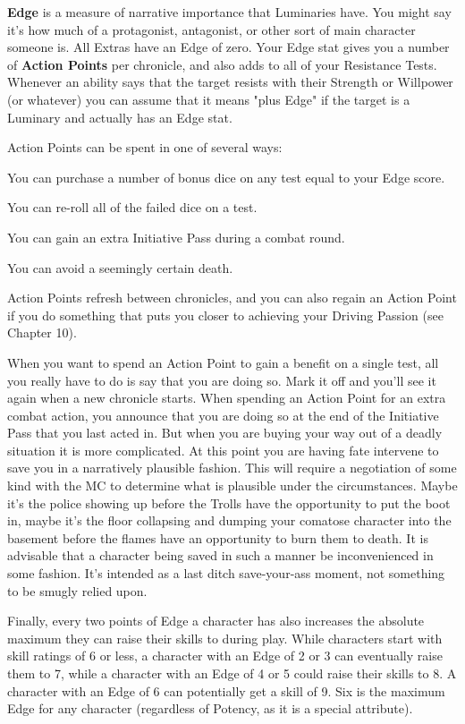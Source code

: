 \hspace{\parindent} \textbf{Edge} is a measure of narrative importance that Luminaries have. You might say it's how much of a protagonist, antagonist, or other sort of main character someone is. All Extras have an Edge of zero. Your Edge stat gives you a number of \textbf{Action Points} per chronicle, and also adds to all of your Resistance Tests. Whenever an ability says that the target resists with their Strength or Willpower (or whatever) you can assume that it means "plus Edge" if the target is a Luminary and actually has an Edge stat.

Action Points can be spent in one of several ways:
\begin{itemize*}
\item You can purchase a number of bonus dice on any test equal to your Edge score.
\item You can re-roll all of the failed dice on a test.
\item You can gain an extra Initiative Pass during a combat round.
\item You can avoid a seemingly certain death.
\end{itemize*}

Action Points refresh between chronicles, and you can also regain an Action Point if you do something that puts you closer to achieving your Driving Passion (see Chapter 10).

When you want to spend an Action Point to gain a benefit on a single test, all you really have to do is say that you are doing so. Mark it off and you'll see it again when a new chronicle starts. When spending an Action Point for an extra combat action, you announce that you are doing so at the end of the Initiative Pass that you last acted in. But when you are buying your way out of a deadly situation it is more complicated. At this point you are having fate intervene to save you in a narratively plausible fashion. This will require a negotiation of some kind with the MC to determine what is plausible under the circumstances. Maybe it's the police showing up before the Trolls have the opportunity to put the boot in, maybe it's the floor collapsing and dumping your comatose character into the basement before the flames have an opportunity to burn them to death. It is advisable that a character being saved in such a manner be inconvenienced in some fashion. It's intended as a last ditch save-your-ass moment, not something to be smugly relied upon.

Finally, every two points of Edge a character has also increases the absolute maximum they can raise their skills to during play. While characters start with skill ratings of 6 or less, a character with an Edge of 2 or 3 can eventually raise them to 7, while a character with an Edge of 4 or 5 could raise their skills to 8. A character with an Edge of 6 can potentially get a skill of 9. Six is the maximum Edge for any character (regardless of Potency, as it is a special attribute).

